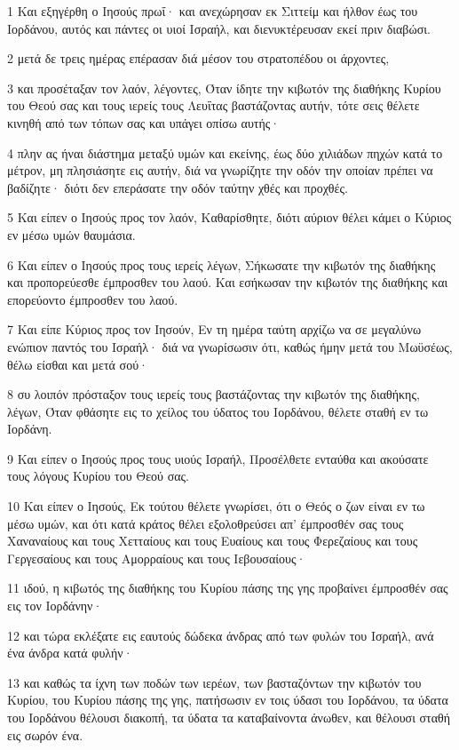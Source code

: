 \par 1 Και εξηγέρθη ο Ιησούς πρωΐ· και ανεχώρησαν εκ Σιττείμ και ήλθον έως του Ιορδάνου, αυτός και πάντες οι υιοί Ισραήλ, και διενυκτέρευσαν εκεί πριν διαβώσι.
\par 2 μετά δε τρεις ημέρας επέρασαν διά μέσον του στρατοπέδου οι άρχοντες,
\par 3 και προσέταξαν τον λαόν, λέγοντες, Όταν ίδητε την κιβωτόν της διαθήκης Κυρίου του Θεού σας και τους ιερείς τους Λευΐτας βαστάζοντας αυτήν, τότε σεις θέλετε κινηθή από των τόπων σας και υπάγει οπίσω αυτής·
\par 4 πλην ας ήναι διάστημα μεταξύ υμών και εκείνης, έως δύο χιλιάδων πηχών κατά το μέτρον, μη πλησιάσητε εις αυτήν, διά να γνωρίζητε την οδόν την οποίαν πρέπει να βαδίζητε· διότι δεν επεράσατε την οδόν ταύτην χθές και προχθές.
\par 5 Και είπεν ο Ιησούς προς τον λαόν, Καθαρίσθητε, διότι αύριον θέλει κάμει ο Κύριος εν μέσω υμών θαυμάσια.
\par 6 Και είπεν ο Ιησούς προς τους ιερείς λέγων, Σήκωσατε την κιβωτόν της διαθήκης και προπορεύεσθε έμπροσθεν του λαού. Και εσήκωσαν την κιβωτόν της διαθήκης και επορεύοντο έμπροσθεν του λαού.
\par 7 Και είπε Κύριος προς τον Ιησούν, Εν τη ημέρα ταύτη αρχίζω να σε μεγαλύνω ενώπιον παντός του Ισραήλ· διά να γνωρίσωσιν ότι, καθώς ήμην μετά του Μωϋσέως, θέλω είσθαι και μετά σού·
\par 8 συ λοιπόν πρόσταξον τους ιερείς τους βαστάζοντας την κιβωτόν της διαθήκης, λέγων, Όταν φθάσητε εις το χείλος του ύδατος του Ιορδάνου, θέλετε σταθή εν τω Ιορδάνη.
\par 9 Και είπεν ο Ιησούς προς τους υιούς Ισραήλ, Προσέλθετε ενταύθα και ακούσατε τους λόγους Κυρίου του Θεού σας.
\par 10 Και είπεν ο Ιησούς, Εκ τούτου θέλετε γνωρίσει, ότι ο Θεός ο ζων είναι εν τω μέσω υμών, και ότι κατά κράτος θέλει εξολοθρεύσει απ' έμπροσθέν σας τους Χαναναίους και τους Χετταίους και τους Ευαίους και τους Φερεζαίους και τους Γεργεσαίους και τους Αμορραίους και τους Ιεβουσαίους·
\par 11 ιδού, η κιβωτός της διαθήκης του Κυρίου πάσης της γης προβαίνει έμπροσθέν σας εις τον Ιορδάνην·
\par 12 και τώρα εκλέξατε εις εαυτούς δώδεκα άνδρας από των φυλών του Ισραήλ, ανά ένα άνδρα κατά φυλήν·
\par 13 και καθώς τα ίχνη των ποδών των ιερέων, των βασταζόντων την κιβωτόν του Κυρίου, του Κυρίου πάσης της γης, πατήσωσιν εν τοις ύδασι του Ιορδάνου, τα ύδατα του Ιορδάνου θέλουσι διακοπή, τα ύδατα τα καταβαίνοντα άνωθεν, και θέλουσι σταθή εις σωρόν ένα.
